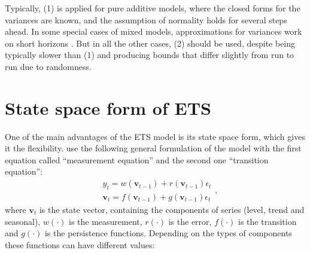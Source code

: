 \documentclass[]{book}
\theoremstyle{definition}
\theoremstyle{definition}
\theoremstyle{definition}
\theoremstyle{definition}
\theoremstyle{remark}
\begin{document}
Typically, (1) is applied for pure additive models, where the closed forms for the variances are known, and the assumption of normality holds for several steps ahead. In some special cases of mixed models, approximations for variances work on short horizons \citep[see Section 6.4 of][]{Hyndman2008b}. But in all the other cases, (2) should be used, despite being typically slower than (1) and producing bounds that differ slightly from run to run due to randomness.

\hypertarget{ETSConventionalModel}{%
\section{State space form of ETS}\label{ETSConventionalModel}}

One of the main advantages of the ETS model is its state space form, which gives it the flexibility. \citet{Hyndman2008b} use the following general formulation of the model with the first equation called ``measurement equation'' and the second one ``transition equation'':
\begin{equation}
  \begin{aligned}
  & {y}_{t} = w(\mathbf{v}_{t-1}) + r(\mathbf{v}_{t-1}) \epsilon_t \\
  & \mathbf{v}_{t} = f(\mathbf{v}_{t-1}) + g(\mathbf{v}_{t-1}) \epsilon_t
  \end{aligned},
  \label{eq:ETSConventionalStateSpace}
\end{equation}
where \(\mathbf{v}_t\) is the state vector, containing the components of series (level, trend and seasonal), \(w(\cdot)\) is the measurement, \(r(\cdot)\) is the error, \(f(\cdot)\) is the transition and \(g(\cdot)\) is the persistence functions. Depending on the types of components these functions can have different values:
\end{document}
